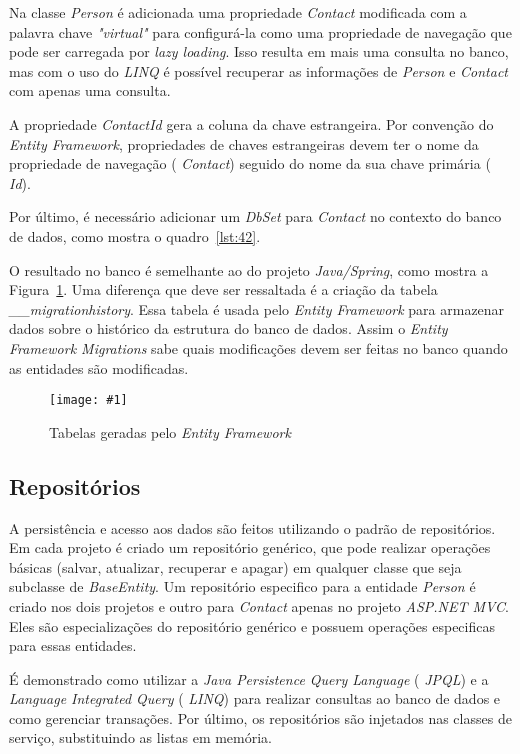 \documentclass[a4paper,12pt]{article}
\newcommand{\figura}[3] {
	\begin{figure}[ht]
		\centering
		\texttt{[image: \#1]}
		\caption{#2}
		\label{#3}
	\end{figure}
	\FloatBarrier
}
\newcommand{\est}[1] {
\textit{#1}}
\newcommand{\classe}[1] {
\textit{#1}}
\newcommand{\sigla}[1] {
\textit{#1}}
\newcommand{\lang}[1] {
\textit{#1}}
\newcommand{\sharpcode}[3] {
	
}
\begin{document}
Na classe \classe{Person} é adicionada uma propriedade \classe{Contact} modificada com a palavra chave \est{"virtual"} para configurá-la como uma propriedade de navegação que pode ser carregada por \est{lazy loading}. Isso resulta em mais uma consulta no banco, mas com o uso do \lang{LINQ} é possível recuperar as informações de \classe{Person} e \classe{Contact} com apenas uma consulta.

A propriedade \est{ContactId} gera a coluna da chave estrangeira. Por convenção do \est{Entity Framework}, propriedades de chaves estrangeiras devem ter o nome da propriedade de navegação (\classe{Contact}) seguido do nome da sua chave primária (\est{Id}).

Por último, é necessário adicionar um \classe{DbSet} para \classe{Contact} no contexto do banco de dados, como mostra o quadro~\ref{lst:42}.

\sharpcode{code/42.txt}{Classe \classe{NetWebCrudContext} com o \classe{DbSet} para \classe{Contact}}{lst:42}

O resultado no banco é semelhante ao do projeto \est{Java/Spring}, como mostra a Figura~\ref{fig:37}. Uma diferença que deve ser ressaltada é a criação da tabela \est{\_\_migrationhistory}. Essa tabela é usada pelo \est{Entity Framework} para armazenar dados sobre o histórico da estrutura do banco de dados. Assim o \est{Entity Framework Migrations} sabe quais modificações devem ser feitas no banco quando as entidades são modificadas.

\figura{37.png}{Tabelas geradas pelo \est{Entity Framework}}{fig:37}

\subsection{Repositórios}

A persistência e acesso aos dados são feitos utilizando o padrão de repositórios. Em cada projeto é criado um repositório genérico, que pode realizar operações básicas (salvar, atualizar, recuperar e apagar) em qualquer classe que seja subclasse de \classe{BaseEntity}. Um repositório especifico para a entidade \classe{Person} é criado nos dois projetos e outro para \classe{Contact} apenas no projeto \est{ASP.NET MVC}. Eles são especializações do repositório genérico e possuem operações especificas para essas entidades.

É demonstrado como utilizar a \est{Java Persistence Query Language} (\lang{JPQL}) e a \est{Language Integrated Query} (\sigla{LINQ}) para realizar consultas ao banco de dados e como gerenciar transações. Por último, os repositórios são injetados nas classes de serviço, substituindo as listas em memória.
\end{document}

